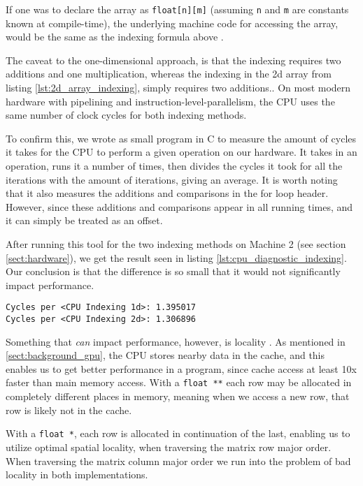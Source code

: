 If one was to declare the array as \texttt{float[n][m]} (assuming \texttt{n} and \texttt{m} are constants known at compile-time), the underlying machine code for accessing the array, would be the same as the indexing formula above \cite[Ch. 1.2]{numericalrecipes}.

The caveat to the one-dimensional approach, is that the indexing requires two additions and one multiplication, whereas the indexing in the 2d array from listing \ref{lst:2d_array_indexing}, simply requires two additions.\cite{numericalrecipes}. On most modern hardware with pipelining and instruction-level-parallelism, the CPU uses the same number of clock cycles for both indexing methods.

To confirm this, we wrote as small program in C to measure the amount of cycles it takes for the CPU to perform a given operation on our hardware. It takes in an operation, runs it a number of times, then divides the cycles it took for all the iterations with the amount of iterations, giving an average. It is worth noting that it also measures the additions and comparisons in the for loop header. However, since these additions and comparisons appear in all running times, and it can simply be treated as an offset.

After running this tool for the two indexing methods on Machine 2 (see section \ref{sect:hardware}), we get the result seen in listing \ref{lst:cpu_diagnostic_indexing}. Our conclusion is that the difference is so small that it would not significantly impact performance.

\begin{lstlisting}[caption={CPU Diagnostic for indexing methods.}, label={lst:cpu_diagnostic_indexing}]
Cycles per <CPU Indexing 1d>: 1.395017
Cycles per <CPU Indexing 2d>: 1.306896
\end{lstlisting}

Something that \textit{can} impact performance, however, is locality \cite[Sect. 6.2]{computersystems}. As mentioned in \ref{sect:background_gpu}, the CPU stores nearby data in the cache, and this enables us to get better performance in a program, since cache access at least 10x faster than main memory access. With a \texttt{float **} each row may be allocated in completely different places in memory, meaning when we access a new row, that row is likely not in the cache.

With a \texttt{float *}, each row is allocated in continuation of the last, enabling us to utilize optimal spatial locality, when traversing the matrix row major order. When traversing the matrix column major order we run into the problem of bad locality in both implementations.\\

